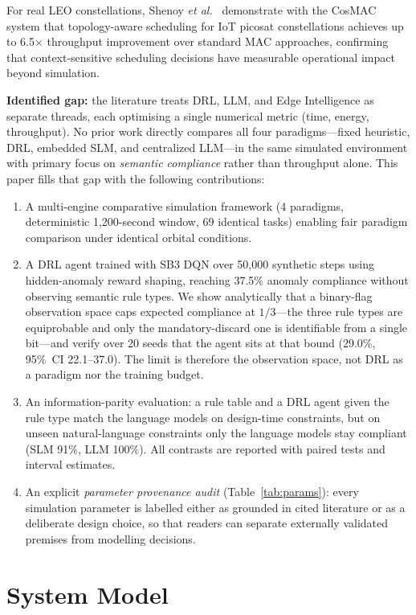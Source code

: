 \documentclass[conference,comsoc,twoside,caption=false]{IEEEtran}
\theoremstyle{definition}
\begin{document}
For real LEO constellations, Shenoy \emph{et al.}~\cite{shenoy2024} demonstrate
with the CosMAC system that topology-aware scheduling for \ac{IoT} picosat
constellations achieves up to 6.5$\times$ throughput improvement over standard
MAC approaches, confirming that context-sensitive scheduling decisions have
measurable operational impact beyond simulation.

\textbf{Identified gap:} the literature treats DRL, LLM, and Edge Intelligence
as separate threads, each optimising a single numerical metric (time, energy,
throughput). No prior work directly compares all four paradigms---fixed
heuristic, DRL, embedded \ac{SLM}, and centralized LLM---in the same simulated
environment with primary focus on \emph{semantic compliance} rather than
throughput alone. This paper fills that gap with the following contributions:
\begin{enumerate}
  \item A multi-engine comparative simulation framework (4 paradigms,
    deterministic 1{,}200-second window, 69 identical tasks) enabling fair
    paradigm comparison under identical orbital conditions.
  \item A DRL agent trained with SB3 DQN over 50{,}000 synthetic steps using
    hidden-anomaly reward shaping, reaching 37.5\% anomaly compliance without
    observing semantic rule types. We show analytically that a binary-flag
    observation space caps expected compliance at $1/3$---the three rule types
    are equiprobable and only the mandatory-discard one is identifiable from a
    single bit---and verify over 20 seeds that the agent sits at that bound
    (29.0\%, 95\%~CI 22.1--37.0). The limit is therefore the observation space,
    not DRL as a paradigm nor the training budget.
  \item An information-parity evaluation: a rule table and a DRL agent given
    the rule type match the language models on design-time constraints, but on
    unseen natural-language constraints only the language models stay compliant
    (SLM 91\%, LLM 100\%). All contrasts are reported with paired
    tests and interval estimates.
  \item An explicit \emph{parameter provenance audit} (Table~\ref{tab:params}):
    every simulation parameter is labelled either as grounded in cited
    literature or as a deliberate design choice, so that readers can separate
    externally validated premises from modelling decisions.
\end{enumerate}

\section{System Model}
\label{sec:sysmodel}
\end{document}
